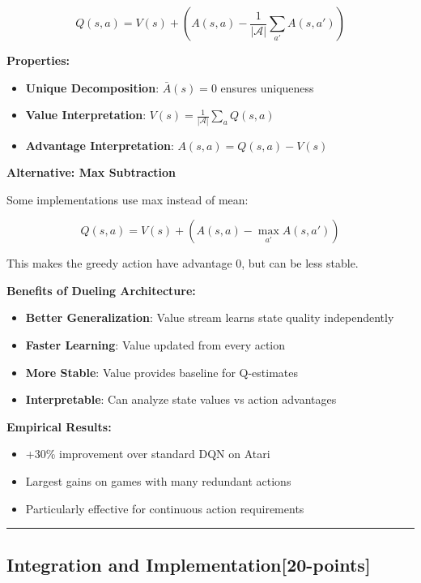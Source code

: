 \documentclass[12pt]{article}
\begin{document}
{{\begin{equation}
Q(s,a) = V(s) + \left(A(s,a) - \frac{1}{|\mathcal{A}|}\sum_{a'} A(s,a')\right)
\end{equation}

\textbf{Properties:}
\begin{itemize}
\item \textbf{Unique Decomposition}: $\bar{A}(s) = 0$ ensures uniqueness
\item \textbf{Value Interpretation}: $V(s) = \frac{1}{|\mathcal{A}|}\sum_a Q(s,a)$
\item \textbf{Advantage Interpretation}: $A(s,a) = Q(s,a) - V(s)$
\end{itemize}

\textbf{Alternative: Max Subtraction}

Some implementations use max instead of mean:

\begin{equation}
Q(s,a) = V(s) + \left(A(s,a) - \max_{a'} A(s,a')\right)
\end{equation}

This makes the greedy action have advantage 0, but can be less stable.

\textbf{Benefits of Dueling Architecture:}
\begin{itemize}
\item \textbf{Better Generalization}: Value stream learns state quality independently
\item \textbf{Faster Learning}: Value updated from every action
\item \textbf{More Stable}: Value provides baseline for Q-estimates
\item \textbf{Interpretable}: Can analyze state values vs action advantages
\end{itemize}

\textbf{Empirical Results:}
\begin{itemize}
\item +30\% improvement over standard DQN on Atari
\item Largest gains on games with many redundant actions
\item Particularly effective for continuous action requirements
\end{itemize}

\noindent\rule{\textwidth}{0.2pt}

\subsection{Integration and Implementation[20-points]}
}}
\end{document}
